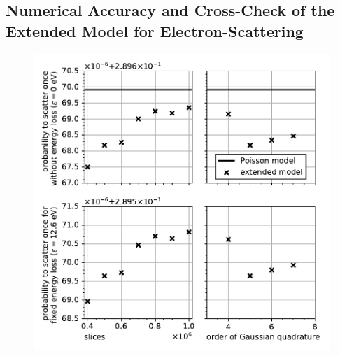 \subsection{Numerical Accuracy and Cross-Check of the Extended Model for Electron-Scattering}
\label{sec:eDepScatCrossSecExtendedModelNumEval}
\begin{figure}[t]
	\centering
	\includegraphics{chapter/energyDependentCrossSec/fig/scatProb1_numericalAccuracy.pdf}

\end{figure}
